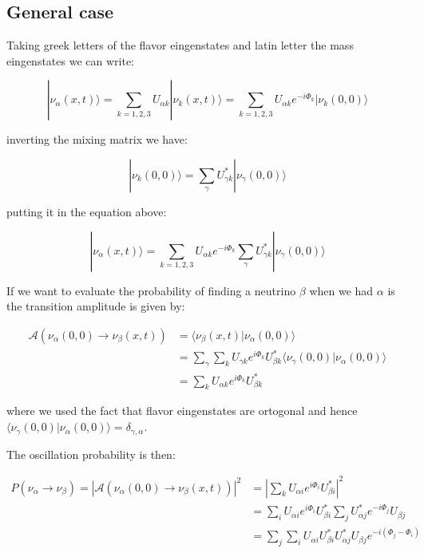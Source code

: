 \documentclass[
  letterpaper,
  DIV=11,
  numbers=noendperiod]{scrreprt}
\begin{document}
\begin{tcolorbox}[enhanced jigsaw, toprule=.15mm, colframe=quarto-callout-color-frame, bottomrule=.15mm, leftrule=.75mm, left=2mm, breakable, rightrule=.15mm, arc=.35mm, opacityback=0, colback=white]
\end{tcolorbox}

\subsection{General case}\label{general-case}

Taking greek letters of the flavor eingenstates and latin letter the
mass eingenstates we can write:

\[|\nu_\alpha(x,t)\rangle = \sum_{k=1,2,3} U_{\alpha k} |\nu_k (x,t)\rangle = \sum_{k=1,2,3} U_{\alpha k} e^{-i\Phi_k}|\nu_k (0,0)\rangle\]

inverting the mixing matrix we have:

\[|\nu_k (0,0)\rangle =\sum_\gamma U^*_{\gamma  k} |\nu_\gamma(0,0)\rangle\]

putting it in the equation above:

\[|\nu_\alpha(x,t)\rangle =\sum_{k=1,2,3} U_{\alpha k} e^{-i\Phi_k}\sum_\gamma U^*_{\gamma  k} |\nu_\gamma(0,0)\rangle\]

If we want to evaluate the probability of finding a neutrino \(\beta\)
when we had \(\alpha\) is the transition amplitude is given by:

\[\begin{aligned}
\mathcal{A}(\nu_\alpha(0,0)\rightarrow \nu_\beta(x,t)) &= \langle \nu_\beta(x,t)|\nu_\alpha(0,0)\rangle \\
&= \sum_\gamma \sum_k U_{\gamma k}e^{i\Phi_k}U^*_{\beta k}\langle \nu_\gamma(0,0)|\nu_\alpha(0,0)\rangle \\
&= \sum_k U_{\alpha  k}e^{i\Phi_k}U^*_{\beta k}
\end{aligned}\]

where we used the fact that flavor eingenstates are ortogonal and hence
\(\langle \nu_\gamma(0,0)|\nu_\alpha(0,0)\rangle = \delta_{\gamma,\alpha}\).

The oscillation probability is then:

\[\begin{aligned}
P(\nu_\alpha \rightarrow \nu_\beta) = |\mathcal{A}(\nu_\alpha(0,0)\rightarrow \nu_\beta(x,t))|^2 &= \left|\sum_k U_{\alpha i}e^{i\Phi_i}U^*_{\beta i}\right|^2\\
&=\sum_i U_{\alpha i}e^{i\Phi_i}U^*_{\beta i}\sum_j U^*_{\alpha j}e^{-i\Phi_j}U_{\beta j}\\
&=\sum_j\sum_i U_{\alpha i}U^*_{\beta i}U^*_{\alpha j}U_{\beta j}e^{-i(\Phi_j-\Phi_i)}
\end{aligned}\]
\end{document}
